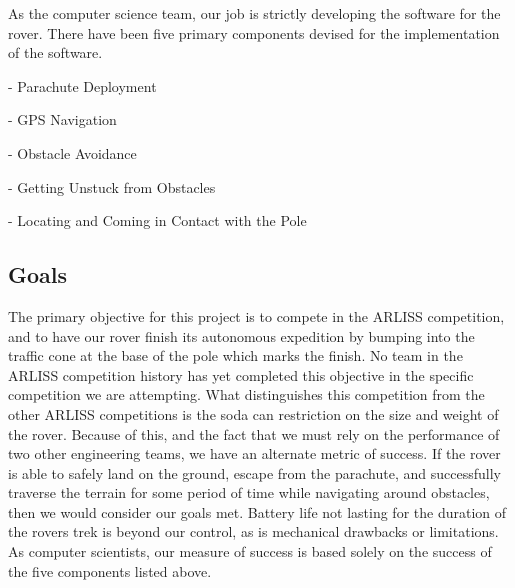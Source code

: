\documentclass[10pt,letterpaper,onecolumn,draftclsnofoot,journal]{IEEEtran}
\begin{document}
\vspace{.3cm}
\par
As the computer science team, our job is strictly developing the software for the rover. There have been five primary components devised for the implementation of the software.\vspace{.3cm}
\par 
\hspace{.5cm} -\hspace{.3cm} Parachute Deployment\par
\hspace{.5cm} -\hspace{.3cm} GPS Navigation\par
\hspace{.5cm} -\hspace{.3cm} Obstacle Avoidance\par
\hspace{.5cm} -\hspace{.3cm} Getting Unstuck from Obstacles\par
\hspace{.5cm} -\hspace{.3cm} Locating and Coming in Contact with the Pole\vspace{.3cm}
\par 
\subsection{\textbf{Goals}}
The primary objective for this project is to compete in the ARLISS competition, and to have our rover finish its autonomous expedition by bumping into the traffic cone at the base of the pole which marks the finish. No team in the ARLISS competition history has yet completed this objective in the specific competition we are attempting. What distinguishes this competition from the other ARLISS competitions is the soda can restriction on the size and weight of the rover. Because of this, and the fact that we must rely on the performance of two other engineering teams, we have an alternate metric of success. If the rover is able to safely land on the ground, escape from the parachute, and successfully traverse the terrain for some period of time while navigating around obstacles, then we would consider our goals met. Battery life not lasting for the duration of the rovers trek is beyond our control, as is mechanical drawbacks or limitations. As computer scientists, our measure of success is based solely on the success of the five components listed above.
\end{document}
